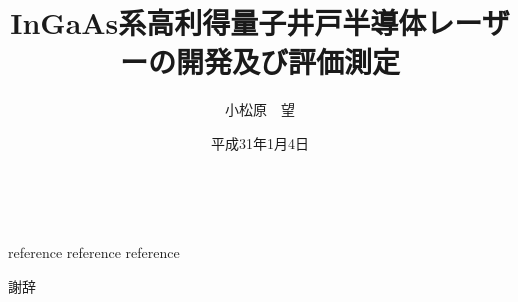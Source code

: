 \documentclass[11pt]{jreport}
\title{InGaAs系高利得量子井戸半導体レーザーの開発及び評価測定}
\author{小松原　望}
\date{平成31年1月4日}
\begin{document}
\maketitle			%

\tableofcontents 	%
\listoffigures 		%
\listoftables　		%


\begin{thebibliography}{99}
 reference
 reference
 reference
%
\end{thebibliography}



謝辞

\end{document}
